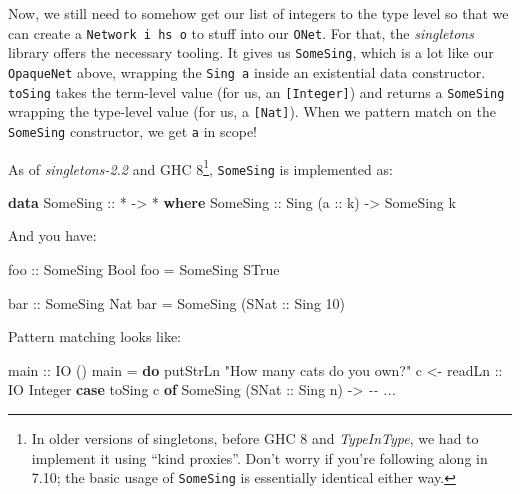 \documentclass[]{article}
\newenvironment{Shaded}{}{}
\newcommand{\CommentTok}[1]{\textcolor[rgb]{0.38,0.63,0.69}{\textit{#1}}}
\newcommand{\DataTypeTok}[1]{\textcolor[rgb]{0.56,0.13,0.00}{#1}}
\newcommand{\DecValTok}[1]{\textcolor[rgb]{0.25,0.63,0.44}{#1}}
\newcommand{\FunctionTok}[1]{\textcolor[rgb]{0.02,0.16,0.49}{#1}}
\newcommand{\KeywordTok}[1]{\textcolor[rgb]{0.00,0.44,0.13}{\textbf{#1}}}
\newcommand{\NormalTok}[1]{#1}
\newcommand{\OperatorTok}[1]{\textcolor[rgb]{0.40,0.40,0.40}{#1}}
\newcommand{\OtherTok}[1]{\textcolor[rgb]{0.00,0.44,0.13}{#1}}
\newcommand{\StringTok}[1]{\textcolor[rgb]{0.25,0.44,0.63}{#1}}
\begin{document}
Now, we still need to somehow get our list of integers to the type level so that
we can create a \texttt{Network\ i\ hs\ o} to stuff into our \texttt{ONet}. For
that, the \emph{singletons} library offers the necessary tooling. It gives us
\texttt{SomeSing}, which is a lot like our \texttt{OpaqueNet} above, wrapping
the \texttt{Sing\ a} inside an existential data constructor. \texttt{toSing}
takes the term-level value (for us, an \texttt{{[}Integer{]}}) and returns a
\texttt{SomeSing} wrapping the type-level value (for us, a \texttt{{[}Nat{]}}).
When we pattern match on the \texttt{SomeSing} constructor, we get \texttt{a} in
scope!

As of \emph{singletons-2.2} and GHC 8\footnote{In older versions of singletons,
  before GHC 8 and \emph{TypeInType}, we had to implement it using ``kind
  proxies''. Don't worry if you're following along in 7.10; the basic usage of
  \texttt{SomeSing} is essentially identical either way.}, \texttt{SomeSing} is
implemented as:

\begin{Shaded}
\begin{Highlighting}[]
\KeywordTok{data} \DataTypeTok{SomeSing}\OtherTok{ ::} \OperatorTok{*} \OtherTok{{-}\textgreater{}} \OperatorTok{*} \KeywordTok{where}
    \DataTypeTok{SomeSing}\OtherTok{ ::} \DataTypeTok{Sing}\NormalTok{ (}\OtherTok{a ::}\NormalTok{ k) }\OtherTok{{-}\textgreater{}} \DataTypeTok{SomeSing}\NormalTok{ k}
\end{Highlighting}
\end{Shaded}

And you have:

\begin{Shaded}
\begin{Highlighting}[]
\OtherTok{foo ::} \DataTypeTok{SomeSing} \DataTypeTok{Bool}
\NormalTok{foo }\OtherTok{=} \DataTypeTok{SomeSing} \DataTypeTok{STrue}

\OtherTok{bar ::} \DataTypeTok{SomeSing} \DataTypeTok{Nat}
\NormalTok{bar }\OtherTok{=} \DataTypeTok{SomeSing}\NormalTok{ (}\DataTypeTok{SNat}\OtherTok{ ::} \DataTypeTok{Sing} \DecValTok{10}\NormalTok{)}
\end{Highlighting}
\end{Shaded}

Pattern matching looks like:

\begin{Shaded}
\begin{Highlighting}[]
\OtherTok{main ::} \DataTypeTok{IO}\NormalTok{ ()}
\NormalTok{main }\OtherTok{=} \KeywordTok{do}
    \FunctionTok{putStrLn} \StringTok{"How many cats do you own?"}
\NormalTok{    c }\OtherTok{\textless{}{-} readLn ::} \DataTypeTok{IO} \DataTypeTok{Integer}
    \KeywordTok{case}\NormalTok{ toSing c }\KeywordTok{of}
      \DataTypeTok{SomeSing}\NormalTok{ (}\DataTypeTok{SNat}\OtherTok{ ::} \DataTypeTok{Sing}\NormalTok{ n) }\OtherTok{{-}\textgreater{}} \CommentTok{{-}{-} ...}
\end{Highlighting}
\end{Shaded}
\end{document}
